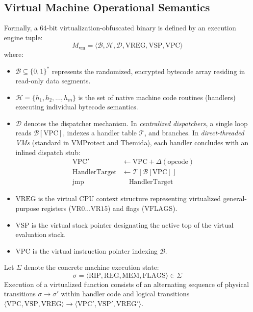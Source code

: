 \documentclass[11pt,a4paper]{article}
\begin{document}
\subsection{Virtual Machine Operational Semantics}
Formally, a 64-bit virtualization-obfuscated binary is defined by an execution engine tuple:
\begin{equation}
M_{\text{vm}} = \langle \mathcal{B}, \mathcal{H}, \mathcal{D}, \text{VREG}, \text{VSP}, \text{VPC} \rangle
\end{equation}
where:
\begin{itemize}
    \item $\mathcal{B} \subseteq \{0, 1\}^*$ represents the randomized, encrypted bytecode array residing in read-only data segments.
    \item $\mathcal{H} = \{h_1, h_2, \dots, h_m\}$ is the set of native machine code routines (handlers) executing individual bytecode semantics.
    \item $\mathcal{D}$ denotes the dispatcher mechanism. In \textit{centralized dispatchers}, a single loop reads $\mathcal{B}[\text{VPC}]$, indexes a handler table $\mathcal{T}$, and branches. In \textit{direct-threaded VMs} (standard in VMProtect and Themida), each handler concludes with an inlined dispatch stub:
    \begin{align}
    \text{VPC}' &\leftarrow \text{VPC} + \Delta(\text{opcode}) \\
    \text{HandlerTarget} &\leftarrow \mathcal{T}[\mathcal{B}[\text{VPC}]] \\
    \text{jmp} &\quad \text{HandlerTarget}
    \end{align}
    \item $\text{VREG}$ is the virtual CPU context structure representing virtualized general-purpose registers ($\text{VR0} \dots \text{VR15}$) and flags ($\text{VFLAGS}$).
    \item $\text{VSP}$ is the virtual stack pointer designating the active top of the virtual evaluation stack.
    \item $\text{VPC}$ is the virtual instruction pointer indexing $\mathcal{B}$.
\end{itemize}

Let $\Sigma$ denote the concrete machine execution state:
\begin{equation}
\sigma = \langle \text{RIP}, \text{REG}, \text{MEM}, \text{FLAGS} \rangle \in \Sigma
\end{equation}
Execution of a virtualized function consists of an alternating sequence of physical transitions $\sigma \rightarrow \sigma'$ within handler code and logical transitions $\langle \text{VPC}, \text{VSP}, \text{VREG} \rangle \rightarrow \langle \text{VPC}', \text{VSP}', \text{VREG}' \rangle$.
\end{document}
